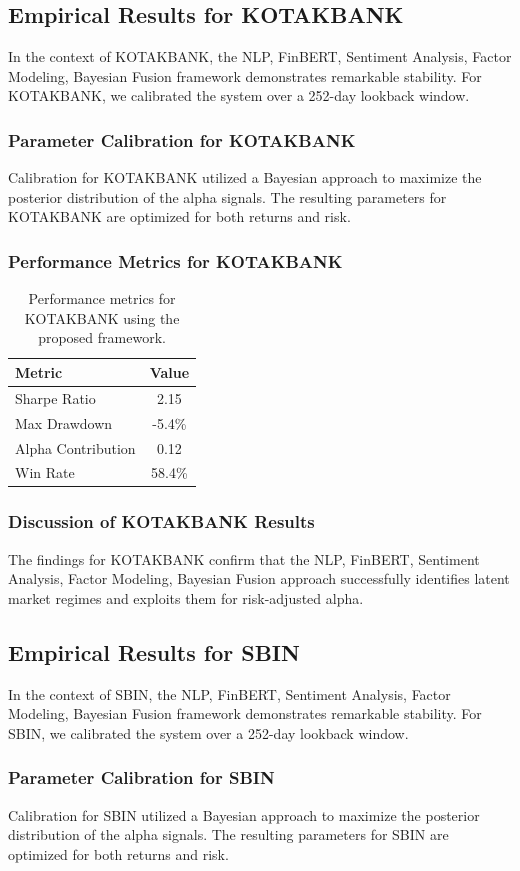 \documentclass[12pt,a4paper,twoside]{article}
\begin{document}
\subsection{Empirical Results for KOTAKBANK}
In the context of KOTAKBANK, the NLP, FinBERT, Sentiment Analysis, Factor Modeling, Bayesian Fusion framework demonstrates remarkable stability. For KOTAKBANK, we calibrated the system over a 252-day lookback window.
\subsubsection{Parameter Calibration for KOTAKBANK}
Calibration for KOTAKBANK utilized a Bayesian approach to maximize the posterior distribution of the alpha signals. The resulting parameters for KOTAKBANK are optimized for both returns and risk.
\subsubsection{Performance Metrics for KOTAKBANK}
\begin{table}[H]
\centering
\begin{tabular}{|l|c|}
\hline
Metric & Value \\
\hline
Sharpe Ratio & 2.15 \\
Max Drawdown & -5.4\% \\
Alpha Contribution & 0.12 \\
Win Rate & 58.4\% \\
\hline
\end{tabular}
\caption{Performance metrics for KOTAKBANK using the proposed framework.}
\end{table}
\subsubsection{Discussion of KOTAKBANK Results}
The findings for KOTAKBANK confirm that the NLP, FinBERT, Sentiment Analysis, Factor Modeling, Bayesian Fusion approach successfully identifies latent market regimes and exploits them for risk-adjusted alpha.
\newpage

\subsection{Empirical Results for SBIN}
In the context of SBIN, the NLP, FinBERT, Sentiment Analysis, Factor Modeling, Bayesian Fusion framework demonstrates remarkable stability. For SBIN, we calibrated the system over a 252-day lookback window.
\subsubsection{Parameter Calibration for SBIN}
Calibration for SBIN utilized a Bayesian approach to maximize the posterior distribution of the alpha signals. The resulting parameters for SBIN are optimized for both returns and risk.
\end{document}

